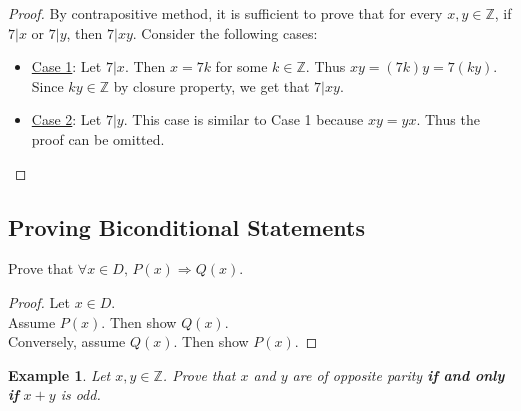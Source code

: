 \documentclass[10pt,reqno]{book}
\theoremstyle{plain}
\newtheorem{example}{Example}
\def\Z{\mathbb{Z}}
\begin{document}
	\begin{proof}
		By contrapositive method, it is sufficient to prove that for every $ x,y \in \Z $, if $ 7|x $ or $ 7|y $, then $ 7|xy $. Consider the following cases:
		\begin{itemize}
			\item \underline{Case 1}: Let $ 7|x $. Then $ x = 7k $ for some $ k \in \Z $. Thus $ xy = (7k)y = 7(ky) $. Since $ ky \in \Z $ by closure property, we get that $ 7|xy $.
			\item \underline{Case 2}: Let $ 7|y $. This case is similar to Case 1 because $ xy=yx $. Thus the proof can be omitted.
		\end{itemize}
	\end{proof}

	\subsection*{Proving Biconditional Statements}
	
	Prove that $ \forall x \in D, \, P(x) \Rightarrow Q(x) $.
	\begin{proof}
		Let $ x \in D $.\\
		Assume $ P(x) $. Then show $ Q(x) $.\\
		Conversely, assume $ Q(x) $. Then show $ P(x) $.
	\end{proof}

	\begin{example}
		Let $ x,y \in \Z $. Prove that $ x $ and $ y $ are of opposite parity \textbf{if and only if} $ x + y $ is odd.
	\end{example}
	
\end{document}
